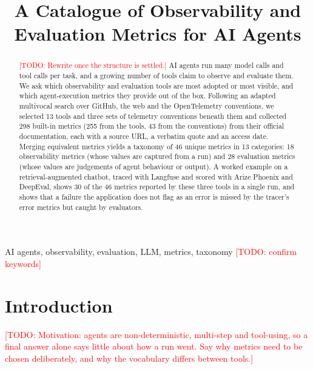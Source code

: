 \documentclass[conference]{IEEEtran}
\newcommand{\todo}[1]{\textcolor{red}{[TODO: #1]}}
\begin{document}
\title{A Catalogue of Observability and Evaluation Metrics for AI Agents}  %

\author{\IEEEauthorblockN{1\textsuperscript{st} \todo{Given Name Surname}}
\IEEEauthorblockA{\textit{\todo{dept. name of organization}} \\
\textit{\todo{name of organization}}\\
\todo{City, Country} \\
\todo{email address or ORCID}}}

\maketitle

\begin{abstract}
\todo{Rewrite once the structure is settled.}
AI agents run many model calls and tool calls per task, and a growing number of tools claim to observe and evaluate them. We ask which observability and evaluation tools are most adopted or most visible, and which agent-execution metrics they provide out of the box.
Following an adapted multivocal search over GitHub, the web and the OpenTelemetry conventions, we selected 13 tools and three sets of telemetry conventions beneath them and collected 298 built-in metrics (255 from the tools, 43 from the conventions) from their official documentation, each with a source URL, a verbatim quote and an access date.
Merging equivalent metrics yields a taxonomy of 46 unique metrics in 13 categories: 18 observability metrics (whose values are captured from a run) and 28 evaluation metrics (whose values are judgements of agent behaviour or output).
A worked example on a retrieval-augmented chatbot, traced with Langfuse and scored with Arize Phoenix and DeepEval, shows 30 of the 46 metrics reported by these three tools in a single run, and shows that a failure the application does not flag as an error is missed by the tracer's error metrics but caught by evaluators.
\end{abstract}

\begin{IEEEkeywords}
AI agents, observability, evaluation, LLM, metrics, taxonomy \todo{confirm keywords}
\end{IEEEkeywords}

\section{Introduction}
\todo{Motivation: agents are non-deterministic, multi-step and tool-using, so a final answer alone says little about how a run went. Say why metrics need to be chosen deliberately, and why the vocabulary differs between tools.}
\end{document}
